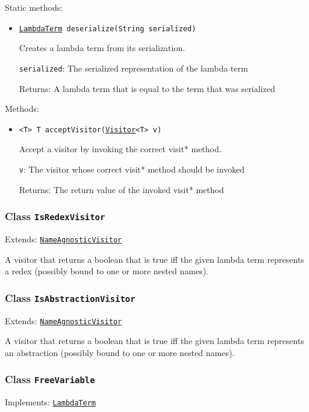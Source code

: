 Static methods:
\begin{itemize}
\item \texttt{\hyperref[type:edu.kit.wavelength.client.model.term.LambdaTerm]{LambdaTerm} deserialize(String serialized)}

Creates a lambda term from its serialization.

\texttt{serialized}: The serialized representation of the lambda term

Returns: A lambda term that is equal to the term that was serialized

\end{itemize}

Methods:
\begin{itemize}
\item \texttt{<T> T acceptVisitor(\hyperref[type:edu.kit.wavelength.client.model.term.Visitor]{Visitor}<T> v)}

Accept a visitor by invoking the correct visit* method.

\texttt{v}: The visitor whose correct visit* method should be invoked

Returns: The return value of the invoked visit* method

\end{itemize}

\subsubsection{Class \texttt{IsRedexVisitor}}
\label{type:edu.kit.wavelength.client.model.term.IsRedexVisitor}
Extends: \texttt{\hyperref[type:edu.kit.wavelength.client.model.term.NameAgnosticVisitor]{NameAgnosticVisitor}}

A visitor that returns a boolean that is true iff the given
 lambda term represents a redex (possibly bound to one
 or more nested names).

\subsubsection{Class \texttt{IsAbstractionVisitor}}
\label{type:edu.kit.wavelength.client.model.term.IsAbstractionVisitor}
Extends: \texttt{\hyperref[type:edu.kit.wavelength.client.model.term.NameAgnosticVisitor]{NameAgnosticVisitor}}

A visitor that returns a boolean that is true iff the given
 lambda term represents an abstraction (possibly bound to one
 or more nested names).

\subsubsection{Class \texttt{FreeVariable}}
\label{type:edu.kit.wavelength.client.model.term.FreeVariable}
Implements: \texttt{\hyperref[type:edu.kit.wavelength.client.model.term.LambdaTerm]{LambdaTerm}}

